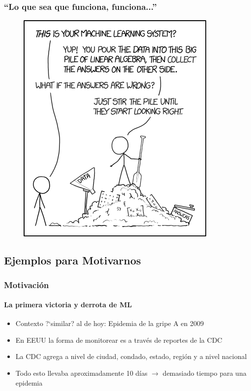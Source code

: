 \documentclass[
  shownotes,
  xcolor={svgnames},
  hyperref={colorlinks,citecolor=DarkBlue,linkcolor=DarkRed,urlcolor=DarkBlue}
  , aspectratio=169]{beamer}
\begin{document}
\begin{frame}
\frametitle{``Lo que sea que funciona, funciona...''}



\begin{figure}[H] \centering
            \captionsetup{justification=centering}  
            \includegraphics[scale=0.45]{figures/machine_learning}
\end{figure}
\end{frame}
\subsection{Ejemplos para Motivarnos}
\begin{frame}
\frametitle{Motivación}
\framesubtitle{La primera victoria y derrota de ML}

\begin{itemize}
  \item Contexto ?`similar? al de hoy: Epidemia de la gripe A en 2009
  \medskip
  \item En EEUU la forma de monitorear es a través de reportes de la CDC 
  \medskip
  \item La CDC agrega a nivel de ciudad, condado, estado, región y a nivel nacional
  \medskip
  \item Todo esto llevaba aproximadamente 10 días $\rightarrow$ demasiado tiempo para una epidemia
\end{itemize}
\end{frame}
\end{document}
